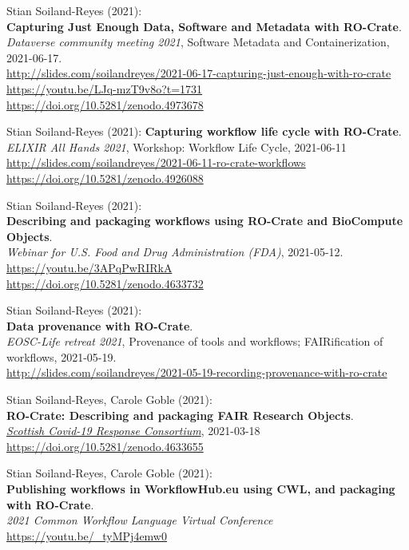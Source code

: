 Stian Soiland-Reyes (2021):\\
\textbf{Capturing Just Enough Data, Software and Metadata with RO-Crate}.\\
\emph{{Dataverse community meeting 2021}}, Software Metadata and Containerization, 2021-06-17.\\
\url{http://slides.com/soilandreyes/2021-06-17-capturing-just-enough-with-ro-crate}\\
\url{https://youtu.be/LJq-mzT9v8o?t=1731} \\
\url{https://doi.org/10.5281/zenodo.4973678}

Stian Soiland-Reyes (2021):
\textbf{Capturing workflow life cycle with RO-Crate}.\\
\emph{ELIXIR All Hands 2021}, Workshop: Workflow Life Cycle, 2021-06-11\\
\url{http://slides.com/soilandreyes/2021-06-11-ro-crate-workflows}
\url{https://doi.org/10.5281/zenodo.4926088}

Stian Soiland-Reyes (2021):\\
\textbf{Describing and packaging workflows using RO-Crate and BioCompute Objects}.\\
\emph{Webinar for U.S. Food and Drug Administration (FDA)}, 2021-05-12.
\url{https://youtu.be/3APqPwRIRkA} \\
\url{https://doi.org/10.5281/zenodo.4633732}

Stian Soiland-Reyes (2021):\\
{\textbf{Data provenance with RO-Crate}}.\\
\emph{EOSC-Life retreat 2021}, Provenance of tools and workflows;
FAIRification of workflows, 2021-05-19.\\
\url{http://slides.com/soilandreyes/2021-05-19-recording-provenance-with-ro-crate}

Stian Soiland-Reyes, Carole Goble (2021):\\
\textbf{RO-Crate: Describing and packaging FAIR Research Objects}.\\
\emph{\href{https://www.gla.ac.uk/research/az/scrc/}{Scottish Covid-19
Response Consortium}}, 2021-03-18
\url{https://doi.org/10.5281/zenodo.4633655}

Stian Soiland-Reyes, Carole Goble (2021):\\
{\textbf{Publishing workflows in WorkflowHub.eu using CWL, and packaging with RO-Crate}}.\\
\emph{2021 Common Workflow Language Virtual Conference}\\
\url{https://youtu.be/_tyMPj4emw0}

